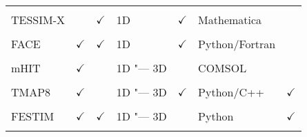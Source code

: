 \begin{table}[ht]
\begin{threeparttable}
\begin{tabularx}{\linewidth}{@{}>{\raggedright}X>{\centering\arraybackslash}X>{\centering\arraybackslash}X>{\centering\arraybackslash}X>{\centering\arraybackslash}X>{\centering\arraybackslash}X>{\centering\arraybackslash}X}
            \cite{Matveev2018}             &               &                         &                       &                    &                       &              \\
            TESSIM-X                       &               & $\checkmark$            & 1D                    & $\checkmark$       & Mathematica           &              \\
            \cite{Schmid2023_2}            &               &                         &                       &                    &                       &              \\
            FACE                           & $\checkmark$  & $\checkmark$            & 1D                    & $\checkmark$       & Python/Fortran        &              \\
            \cite{Smirnov2017,Smirnov2024} &               &                         &                       &                    &                       &              \\
            mHIT                           & $\checkmark$  &                         & 1D "--- 3D            &                    & COMSOL                &              \\
            \cite{Candido2021}             &               &                         &                       &                    &                       &              \\
            TMAP8                          & $\checkmark$  &                         & 1D "--- 3D            & $\checkmark$       & Python/C++            & $\checkmark$ \\
            \cite{Simon2025}               &               &                         &                       &                    &                       &              \\
            FESTIM                         & $\checkmark$  & $\checkmark$            & 1D "--- 3D            &                    & Python                & $\checkmark$ \\
            \cite{Kulagin2024}             &               &                         &                       &                    &                       &              \\
            \bottomrule
        \end{tabularx}

    \end{threeparttable}
\end{table}
